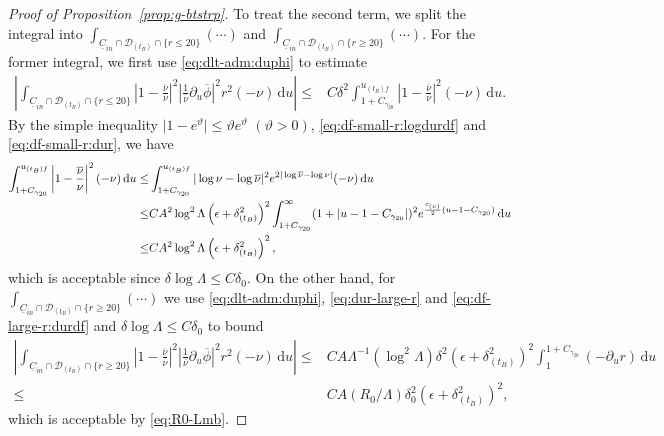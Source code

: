\documentclass[10pt, reqno]{amsart}
\theoremstyle{definition}
\theoremstyle{remark}
\theoremstyle{conjecture}
\numberwithin{equation}{section}
\newcommand{\abs}[1]{\vert#1\vert}
\newcommand{\set}[1]{\{#1\}}
\newcommand{\ud}{\mathrm{d}}
\newcommand{\rd}{\partial}
\newcommand{\0}{\emptyset}
\newcommand{\gmm}{\gamma}
\newcommand{\dlt}{\delta}
\newcommand{\eps}{\epsilon}
\newcommand{\Lmb}{\Lambda}
\newcommand{\vtht}{\vartheta}
\newcommand{\calD}{\mathcal D}
\newcommand{\uC}{\underline{C}}
\newcommand{\dur}{\nu}
\newcommand{\de}{\delta}
\newcommand{\phibg}{\overline{\phi}}				%
\newcommand{\durbg}{\overline{\dur}}				%
\newcommand{\Abs}[1]{\left\vert #1 \right\vert}
\begin{document}
\begin{proof}[Proof of Proposition~\ref{prop:g-btstrp}]
To treat the second term, we split the integral into $\int_{\uC_{in} \cap \calD_{(t_{B})} \cap \set{r \leq 20}} (\cdots)$ and $\int_{\uC_{in} \cap \calD_{(t_{B})} \cap \set{r \geq 20}} (\cdots)$. For the former integral, we first use \eqref{eq:dlt-adm:duphi} to estimate
\begin{align*}
	\Abs{\int_{\uC_{in} \cap \calD_{(t_{B})} \cap \set{r \leq 20}} \Abs{ 1 - \frac{\durbg}{\dur}}^{2} \Abs{\frac{1}{\durbg} \rd_{u} \phibg}^{2} r^{2}(- \dur) \, \ud u }
	\leq & C \dlt^{2} \int_{1 + C_{\gmm_{20}}}^{u_{(t_{B}) f}} \Abs{1 - \frac{\durbg}{\dur}}^{2} (- \dur) \, \ud u.
\end{align*}
By the simple inequality $\abs{1 - e^{\vtht}} \leq \vtht e^{\vtht}$ $(\vtht > 0)$, \eqref{eq:df-small-r:logdurdf} and \eqref{eq:df-small-r:dur}, we have
\begin{align} 
	\int_{1 + C_{\gmm_{20}}}^{u_{(t_{B}) f}} \Abs{1 - \frac{\durbg}{\dur}}^{2} (- \dur) \, \ud u
	\leq & \int_{1 + C_{\gmm_{20}}}^{u_{(t_{B}) f}} \abs{\log \dur - \log \durbg}^{2} e^{2 \abs{\log \durbg - \log \dur}} (- \dur) \, \ud u \notag \\
	\leq & C A^{2} \log^{2} \Lmb \left( \eps + \dlt_{(t_{B})}^{2} \right)^{2} \int_{1 + C_{\gmm_{20}}}^{\infty} (1 + \abs{u - 1 - C_{\gmm_{20}}})^{2} e^{\frac{c_{(\dur)}}{2} (u - 1 - C_{\gmm_{20}})} \, \ud u	\notag \\
	\leq & C A^{2} \log^{2} \Lmb \left( \eps + \dlt_{(t_{B})}^{2} \right)^{2}, \label{eq:g-btstrp:du-1}
\end{align}
which is acceptable since $\de\log\Lmb\leq C\de_0$. On the other hand, for $\int_{\uC_{in} \cap \calD_{(t_{B})} \cap \set{r \geq 20}}(\cdots)$ we use \eqref{eq:dlt-adm:duphi}, \eqref{eq:dur-large-r} and \eqref{eq:df-large-r:durdf} and $\de\log\Lmb\leq C\de_0$ to bound
\begin{align*}
	\Abs{\int_{\uC_{in} \cap \calD_{(t_{B})} \cap \set{r \geq 20}} \Abs{ 1 - \frac{\durbg}{\dur}}^{2} \Abs{\frac{1}{\durbg} \rd_{u} \phibg}^{2} r^{2}(- \dur) \, \ud u }
	\leq & C A \Lmb^{-1} (\log^{2} \Lmb) \dlt^{2} \left( \eps + \dlt_{(t_{B})}^{2} \right)^{2} 
			\int_{1}^{1 + C_{\gmm_{20}}} ( - \rd_{u} r) \, \ud u \\
	\leq & C A (R_{0} / \Lmb) \dlt_{0}^{2} \left( \eps + \dlt_{(t_{B})}^{2} \right)^{2},
\end{align*}
which is acceptable by \eqref{eq:R0-Lmb}.



\end{proof}
\end{document}
